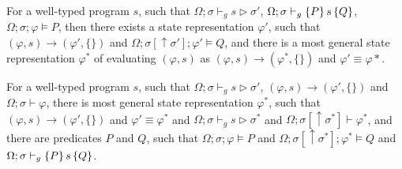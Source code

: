 \begin{theorem}\label{thm:proof-soundness}\rm 
For a well-typed program $s$, such that $\Omega;\sigma\vdash_g s \triangleright \sigma'$, $\Omega;\sigma\vdash_{g}\{P\}\, s \,\{Q\}$, $\Omega;\sigma;\varphi\models P$, then there exists a state representation $\varphi'$, such that $(\varphi,s)\longrightarrow (\varphi',\{\})$ and $\Omega;\sigma[\uparrow\sigma'];\varphi'\models Q$, and there is a most general state representation $\varphi^*$ of evaluating $(\varphi,s)$ as $(\varphi,s)\longrightarrow (\varphi^*,\{\})$ and $\varphi' \equiv \varphi*$.
\end{theorem}

\begin{theorem}\label{thm:proof-completeness}\rm 
For a well-typed program $s$, such that $\Omega;\sigma\vdash_g s \triangleright \sigma'$, $(\varphi,s)\longrightarrow (\varphi',\{\})$ and $\Omega;\sigma\vdash \varphi$, there is most general state representation $\varphi^*$, such that $(\varphi,s)\longrightarrow (\varphi',\{\})$ and $\varphi' \equiv \varphi^*$ and $\Omega;\sigma\vdash_g s \triangleright \sigma^*$ and $\Omega;\sigma[\uparrow \sigma^*]\vdash \varphi^*$, and there are predicates $P$ and $Q$, such that $\Omega;\sigma;\varphi\models P$ and $\Omega;\sigma[\uparrow\sigma^*];\varphi^* \models Q$ and $\Omega;\sigma\vdash_{g}\{P\}\, s \,\{Q\}$.
\end{theorem}




